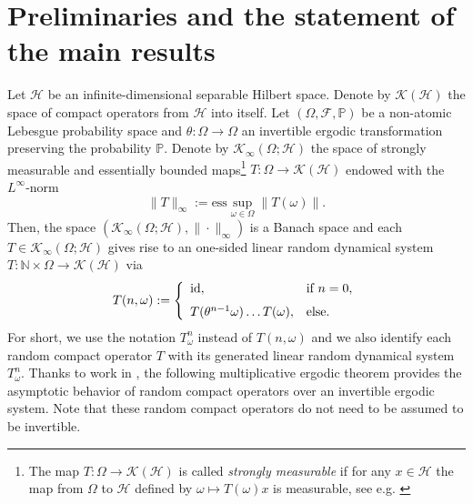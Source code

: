 \documentclass[pdflatex,sn-mathphys-num]{sn-jnl}%
\theoremstyle{thmstyleone}%
\theoremstyle{thmstyletwo}%
\theoremstyle{thmstylethree}%
\newcommand{\N}{\mathbb{N}}
\newcommand{\mP}{\mathbb{P}}
\newcommand{\cH}{\mathcal{H}}
\newcommand{\cF}{\mathcal{F}}
\newcommand{\cK}{\mathcal{K}}
\newcommand{\id}{\hbox{id}}
\numberwithin{equation}{section}
\begin{document}
\section{Preliminaries and the statement of the main results}\label{Section2}
%
%
%
Let $\cH$ be an infinite-dimensional separable Hilbert space. Denote by $\cK(\cH)$ the space of compact operators from $\cH$ into itself. Let $(\Omega,\cF,\mP)$ be a non-atomic Lebesgue probability space and $\theta:\Omega\rightarrow \Omega$ an invertible ergodic transformation preserving the probability $\mP$.  Denote by $\mathcal K_{\infty}(\Omega;\mathcal H)$ the space of strongly measurable and essentially bounded maps\footnote{The map $T:\Omega\rightarrow \cK(\cH)$ is called \emph{strongly measurable} if for any $x\in\cH$ the map from $\Omega$ to $\cH$ defined by  $\omega\mapsto  T(\omega) x$ is measurable, see e.g. \cite{LianLu2010}}  $T:\Omega\rightarrow \mathcal K(\mathcal H)$ endowed with the $L^{\infty}$-norm
\[
\|T\|_{\infty}:=\mbox{ess}\sup_{\omega\in\Omega} \|T(\omega)\|.
\]
Then, the space $(\mathcal K_{\infty}(\Omega;\mathcal H), \|\cdot\|_{\infty})$ is a Banach space and each $T\in \mathcal K_{\infty}(\Omega;\mathcal H)$ gives rise to an one-sided linear random dynamical system $T:\N\times \Omega\rightarrow  \mathcal K(\mathcal H)$ via
\begin{equation}\label{GeneratedLinearRDS}
T(n,\omega)
:=
\left\{
  \begin{array}{ll}
    \id , & \hbox{if } n=0, \\[1.5ex]
    T(\theta^{n-1}\omega)\dots T(\omega), & \hbox{else.}
  \end{array}
\right.
\end{equation}
For short, we use the notation $T_{\omega}^n$ instead of $T(n,\omega)$ and we also identify each random compact operator $T$ with its generated linear random dynamical system $T^n_{\omega}$. Thanks to work in \cite{Ruelle_1982,Cecilia,Cecilia15}, the following multiplicative ergodic theorem provides the asymptotic behavior of random compact operators over an invertible ergodic system. Note that these random compact operators do not need to be assumed to be invertible. 
%
%
%
\end{document}
